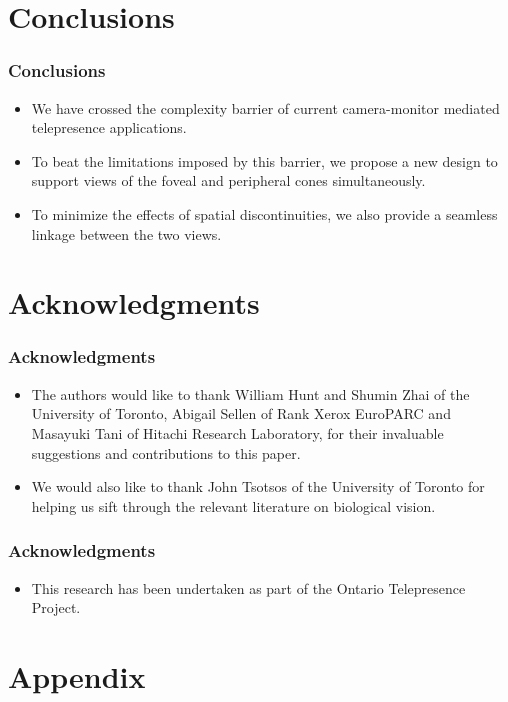 \documentclass{beamer}
\begin{document}
\section[Conclusions]{Conclusions}


\begin{frame}
\frametitle{Conclusions}

\begin{itemize}
\item We have crossed the complexity barrier of current camera-monitor mediated telepresence applications.
\item To beat the limitations imposed by this barrier, we propose a new design to support views of the foveal and peripheral cones simultaneously.
\item To minimize the effects of spatial discontinuities, we also provide a seamless linkage between the two views.
\end{itemize}

\end{frame}

\section[Acknowledgments]{Acknowledgments}


\begin{frame}
\frametitle{Acknowledgments}

\begin{itemize}
\item The authors would like to thank William Hunt and Shumin Zhai of the University of Toronto, Abigail Sellen of Rank Xerox EuroPARC and Masayuki Tani of Hitachi Research Laboratory, for their invaluable suggestions and contributions to this paper.
\item We would also like to thank John Tsotsos of the University of Toronto for helping us sift through the relevant literature on biological vision.
\end{itemize}

\end{frame}

\begin{frame}
\frametitle{Acknowledgments}

\begin{itemize}
\item This research has been undertaken as part of the Ontario Telepresence Project.
\end{itemize}

\end{frame}

\section[Appendix]{Appendix}
\end{document}
